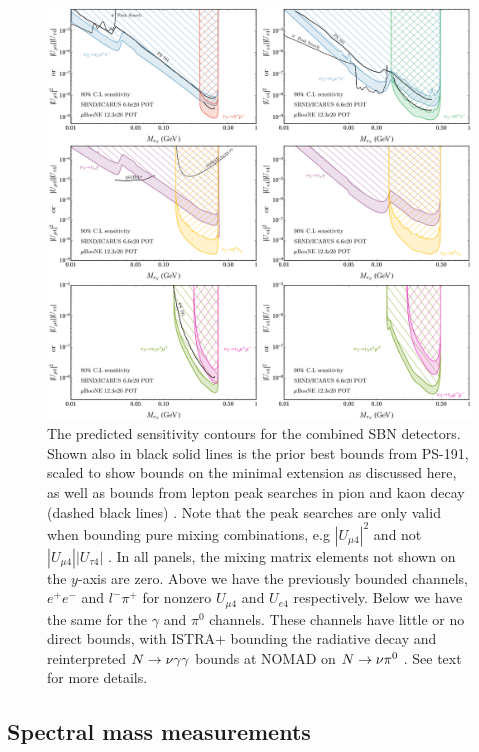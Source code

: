 \documentclass[11pt, a4paper]{article}
\def\ster{\ensuremath N}
\begin{document}
\begin{figure}[t]
\center
\includegraphics[width=1.0\textwidth]{figures/band_sbn_new.pdf}

\caption{\label{fig:band_sbn}The predicted sensitivity contours for the
combined SBN detectors. Shown also in black solid lines is the prior best bounds
from PS-191, scaled to show bounds on the minimal extension as discussed here,
as well as bounds from lepton peak searches in pion and kaon decay
\cite{PhysRevD.46.R885,PhysRevLett.68.3000}(dashed black lines) . Note that the
peak searches are only valid when bounding pure mixing combinations, e.g
$|U_{\mu 4}|^2$ and not $|U_{\mu 4}||U_{\tau 4}|$ . In all panels, the mixing
matrix elements not shown on the $y$-axis are zero. Above we have the
previously bounded channels, $e^+e^-$ and $l^- \pi^+$ for nonzero $U_{\mu 4}$
and $U_{e4}$ respectively. Below we have the same for the $\gamma$ and $\pi^0$
channels. These channels have little or no direct bounds, with ISTRA+ bounding
the radiative decay\cite{Duk:2011yv} and reinterpreted $\ster \rightarrow \nu
\gamma \gamma$ bounds at NOMAD on $\ster \rightarrow \nu \pi^0$
\cite{Gninenko:1998nn}. See text for more details. }

\end{figure}

\subsection{\label{sec:timing_physics}Spectral mass measurements}
\end{document}
